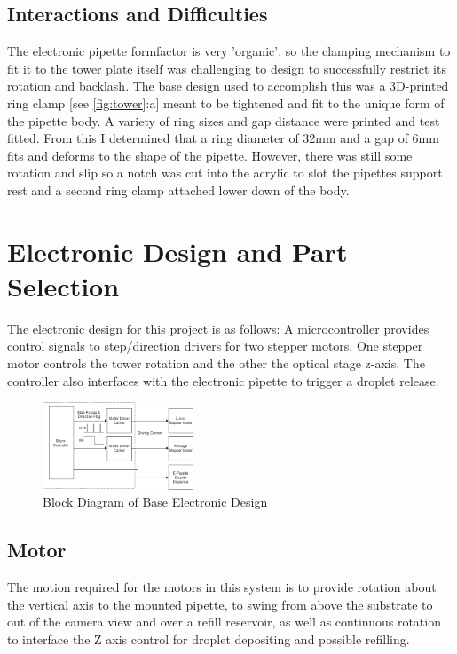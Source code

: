 \subsection{Interactions and Difficulties}
The electronic pipette formfactor is very 'organic', so the clamping mechanism to fit it to the tower plate itself was challenging to design to successfully restrict its rotation and backlash.  
The base design used to accomplish this was a 3D-printed ring clamp [see \ref{fig:tower}:a] meant to be tightened and fit to the unique form of the pipette body. A variety of ring sizes and gap distance were printed and test fitted. From this I determined that a ring diameter of 32mm and a gap of 6mm fits and deforms to the shape of the pipette. However, there was still some rotation and slip so a notch was cut into the acrylic to slot the pipettes support rest and a second ring clamp attached lower down of the body. 

\section{Electronic Design and Part Selection}

The electronic design for this project is as follows:
A microcontroller provides control signals to step/direction drivers for two stepper motors. One stepper motor controls the tower rotation and the other the optical stage z-axis. The controller also interfaces with the electronic pipette to trigger a droplet release.

\begin{figure}[h]
    \centering
    \includegraphics[width=0.4\textwidth]{img/ED_block_diag.png}
    \caption{Block Diagram of Base Electronic Design}
    \label{fig:e_block}
\end{figure}

\subsection{Motor}
The motion required for the motors in this system is to provide rotation about the vertical axis to the mounted pipette, to swing from above the substrate to out of the camera view and over a refill reservoir, as well as continuous rotation to interface the Z axis control for droplet depositing and possible refilling.  

